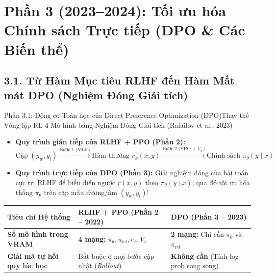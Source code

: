 \section{Phần 3 (2023--2024): Tối ưu hóa Chính sách Trực tiếp (DPO \& Các Biến thể)}

\subsection{3.1. Từ Hàm Mục tiêu RLHF đến Hàm Mất mát DPO (Nghiệm Đóng Giải tích)}

\begin{frame}{Phần 3.1: Động cơ Toán học của Direct Preference Optimization (DPO)}{Thay thế Vòng lặp RL 4 Mô hình bằng Nghiệm Đóng Giải tích (Rafailov et al., 2023)}
  \small
  \begin{itemize}\setlength{\itemsep}{5pt}
    \item \textbf{Quy trình gián tiếp của RLHF + PPO (Phần 2):}
      \[
        \text{Cặp } (y_w, y_l) \xrightarrow{\text{Bước 1 (MLE)}} \text{Hàm thưởng } r_\phi(x, y) \xrightarrow{\text{Bước 2 (PPO + } V_\psi\text{)}} \text{Chính sách } \pi_\theta(y \mid x)
      \]
    \item \textbf{Quy trình trực tiếp của DPO (Phần 3):} Giải nghiệm đóng của bài toán cực trị RLHF để biểu diễn ngược $r(x, y)$ theo $\pi_\theta(y \mid x)$, qua đó tối ưu hóa thẳng $\pi_\theta$ trên cặp mẫu dương/âm $(y_w, y_l)$!
  \end{itemize}

  \vspace{0.06cm}
  \footnotesize
  \renewcommand{\arraystretch}{1.28}
  \begin{tabularx}{\textwidth}{@{}l X X@{}}
    \toprule
    \textbf{Tiêu chí Hệ thống} & \textbf{RLHF + PPO (Phần 2 -- 2022)} & \textbf{DPO (Phần 3 -- 2023)} \\
    \midrule
    \textbf{Số mô hình trong VRAM} & \textbf{4 mạng:} $\pi_\theta, \pi_{\text{ref}}, r_\phi, V_\psi$ & \textbf{2 mạng:} Chỉ cần $\pi_\theta$ và $\pi_{\text{ref}}$ \\
    \hline
    \textbf{Giải mã tự hồi quy lúc học} & Bắt buộc ở mọi bước cập nhật (\textit{Rollout}) & \textbf{Không cần} (Tính log-prob song song) \\
    \bottomrule
  \end{tabularx}
\end{frame}

